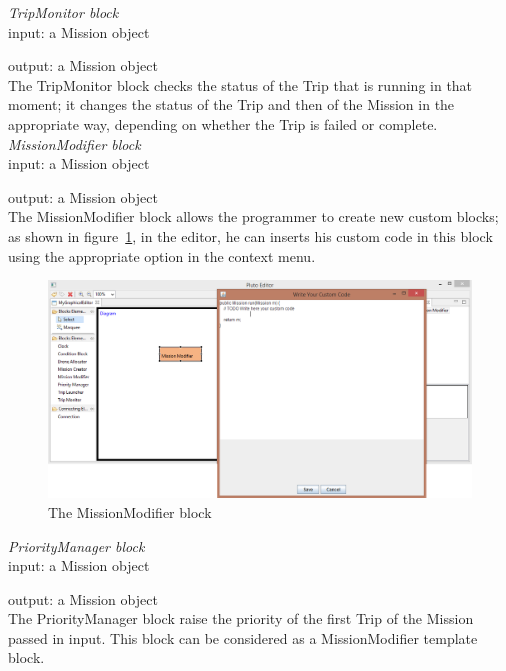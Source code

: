 \textit{TripMonitor block}
\\

input: a Mission object

output: a Mission object
\\

The TripMonitor block checks the status of the Trip that is running in that moment; it changes the status of the Trip and then of the Mission in the appropriate way, depending on whether the Trip is failed or complete.
\\

\textit{MissionModifier block}\label{mm}
\\

input: a Mission object

output: a Mission object
\\

The MissionModifier block allows the programmer to create new custom blocks; as shown in figure~\ref{fig:missionmodifier}, in the editor, he can inserts his custom code in this block using the appropriate option in the context menu.
\\

\begin{figure}[htbl]
\centering
\includegraphics[width=\linewidth]
{pictures/MissionModifier.png}
  \caption{The MissionModifier block}
  \label{fig:missionmodifier}
\end{figure}

\textit{PriorityManager block}
\\

input: a Mission object

output: a Mission object
\\

The PriorityManager block raise the priority of the first Trip of the Mission passed in input.
This block can be considered as a MissionModifier template block.
\\

